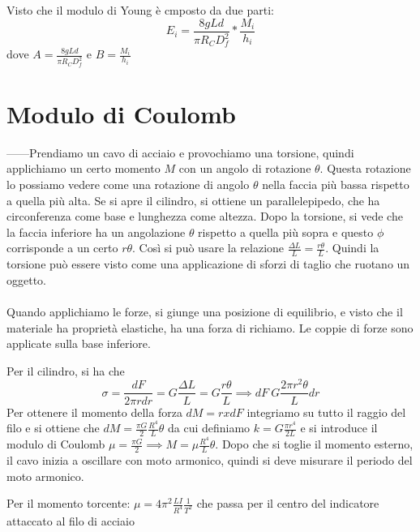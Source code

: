 \documentclass[a4paper]{article}
\begin{document}
Visto che il modulo di Young è cmposto da due parti:
\begin{equation}
    E_i = \frac{8gLd}{\pi R_C D^2_f} * \frac{M_i}{h_i}
\end{equation}
dove $A = \frac{8gLd}{\pi R_C D^2_f}$ e $ B = \frac{M_i}{h_i}$

\section{Modulo di Coulomb}
------Prendiamo un cavo di acciaio e provochiamo una torsione, quindi applichiamo un certo momento $M$ con un angolo di rotazione $\theta$. Questa rotazione lo possiamo vedere come una rotazione di angolo $\theta$ nella faccia più bassa rispetto a quella più alta. Se si apre il cilindro, si ottiene un parallelepipedo, che ha circonferenza come base e lunghezza come altezza. Dopo la torsione, si vede che la faccia inferiore ha un angolazione $\theta$ rispetto a quella più sopra e questo $\phi$ corrisponde a un certo $r\theta$. Così si può usare la relazione $\frac{\Delta L}{L} = \frac{r\theta}{L}$. Quindi la torsione può essere visto come una applicazione di sforzi di taglio che ruotano un oggetto. \\
\\
Quando applichiamo le forze, si giunge una posizione di equilibrio, e visto che il materiale ha proprietà elastiche, ha una forza di richiamo. Le coppie di forze sono applicate sulla base inferiore. 

Per il cilindro, si ha che 
\begin{equation}
    \sigma = \frac{dF}{2\pi r dr} = G \frac{\Delta L}{L} = G \frac{r\theta}{L} \implies dF \ G \frac{2\pi r^2 \theta}{L} dr
\end{equation}
Per ottenere il momento della forza $dM = r x dF$ integriamo su tutto il raggio del filo e si ottiene che $dM = \frac{\pi G}{2} \frac{R^4}{L} \theta$ da cui definiamo $k = G \frac{\pi r^4}{2L}$ e si introduce il modulo di Coulomb $\mu = \frac{\pi G}{2} \implies M = \mu \frac{R^4}{L}\theta$. Dopo che si toglie il momento esterno, il cavo inizia a oscillare con moto armonico, quindi si deve misurare il periodo del moto armonico.

Per il momento torcente: $\mu = 4\pi^2 \frac{LI}{R^4}\frac{1}{T^2}$ che passa per il centro del indicatore attaccato al filo di acciaio
\end{document}
